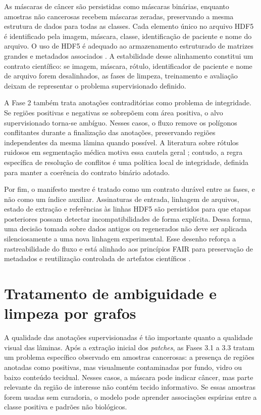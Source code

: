 As máscaras de câncer são persistidas como máscaras binárias, enquanto amostras
não cancerosas recebem máscaras zeradas, preservando a mesma estrutura de dados
para todas as classes. Cada elemento único no arquivo HDF5 é identificado pela imagem, máscara, classe, identificação de paciente e nome do arquivo. O uso de HDF5 é adequado ao armazenamento estruturado de
matrizes grandes e metadados associados \cite{folk2011hdf5}. A estabilidade
desse alinhamento constitui um contrato científico: se imagem, máscara, rótulo,
identificador de paciente e nome de arquivo forem desalinhados, as fases de
limpeza, treinamento e avaliação deixam de representar o problema supervisionado
definido.

A Fase 2 também trata anotações contraditórias como problema de integridade. Se
regiões positivas e negativas se sobrepõem com área positiva, o alvo
supervisionado torna-se ambíguo. Nesses casos, o fluxo remove os polígonos
conflitantes durante a finalização das anotações, preservando regiões
independentes da mesma lâmina quando possível. A literatura sobre rótulos
ruidosos em segmentação médica motiva essa cautela geral \cite{yu2020noisy};
contudo, a regra específica de resolução de conflitos é uma política local de
integridade, definida para manter a coerência do contrato binário adotado.

Por fim, o manifesto mestre é tratado como um contrato durável entre as fases,
e não como um índice auxiliar. Assinaturas de entrada, linhagem de arquivos,
estado de extração e referências às linhas HDF5 são persistidos para que etapas
posteriores possam detectar incompatibilidades de forma explícita. Dessa forma,
uma decisão tomada sobre dados antigos ou regenerados não deve ser aplicada
silenciosamente a uma nova linhagem experimental. Esse desenho reforça a
rastreabilidade do fluxo e está alinhado aos princípios FAIR para preservação de
metadados e reutilização controlada de artefatos científicos
\cite{wilkinson2016fair}.

\section{Tratamento de ambiguidade e limpeza por grafos}
\label{sec:met_limpeza_grafos}

A qualidade das anotações supervisionadas é tão importante quanto a qualidade
visual das lâminas. Após a extração inicial dos \textit{patches}, as
Fases 3.1 a 3.3 tratam um problema específico observado em amostras cancerosas:
a presença de regiões anotadas como positivas, mas visualmente contaminadas por
fundo, vidro ou baixo conteúdo tecidual. Nesses casos, a máscara pode indicar
câncer, mas parte relevante da região de interesse não contém tecido
informativo. Se essas amostras forem usadas sem curadoria, o modelo pode
aprender associações espúrias entre a classe positiva e padrões não biológicos.

